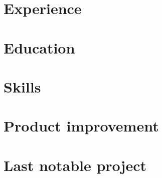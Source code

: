 \def\sitepage{tooling}
\section{Experience}





\section{Education}







\clearpage



\section{Skills}
\begin{cvcolumns}
  
  
  
\end{cvcolumns}


\section{Product improvement}


\section{Last notable project}




